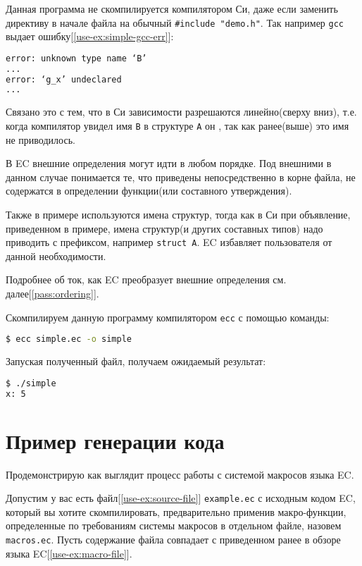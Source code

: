 Данная программа не скомпилируется компилятором Си, даже если заменить директиву в начале файла на обычный \verb|#include "demo.h"|.
Так например \verb|gcc| выдает ошибку[\ref{use-ex:simple-gcc-err}]:

\begin{lstlisting}[language=Bash, caption={Ошибка gcc}, label={use-ex:simple-gcc-err}]
error: unknown type name ‘B’
...
error: ‘g_x’ undeclared
...
\end{lstlisting}

Связано это с тем, что в Си зависимости разрешаются линейно(сверху вниз), 
т.е. когда компилятор увидел имя \verb|B| в структуре \verb|A| он , так как ранее(выше) это имя не приводилось.

В EC внешние определения могут идти в любом порядке. Под внешними в данном случае понимается те, 
что приведены непосредственно в корне файла, не содержатся в определении функции(или составного утверждения).

Также в примере используются  имена структур, тогда как в Си при объявление, 
приведенном в примере, имена структур(и других составных типов) надо приводить с префиксом, например \verb|struct A|.
EC избавляет пользователя от данной необходимости.

Подробнее об ток, как EC преобразует внешние определения см. далее[\ref{pass:ordering}].

Скомпилируем данную программу компилятором \verb|ecc| с помощью команды:
\begin{lstlisting}[language=Bash]
$ ecc simple.ec -o simple
\end{lstlisting}

Запуская полученный файл, получаем ожидаемый результат:
\begin{lstlisting}[language=Bash]
$ ./simple
x: 5
\end{lstlisting}


\section{Пример генерации кода}
\label{use-ex:code-gen}

Продемонстрирую как выглядит процесс работы с системой макросов языка EC.

Допустим у вас есть файл[\ref{use-ex:source-file}] \verb|example.ec| с исходным кодом EC, который вы хотите скомпилировать, предварительно применив макро-функции, определенные по требованиям системы макросов в отдельном файле, назовем \verb|macros.ec|.
Пусть содержание файла совпадает с приведенном ранее в обзоре языка EC[\ref{use-ex:macro-file}].

